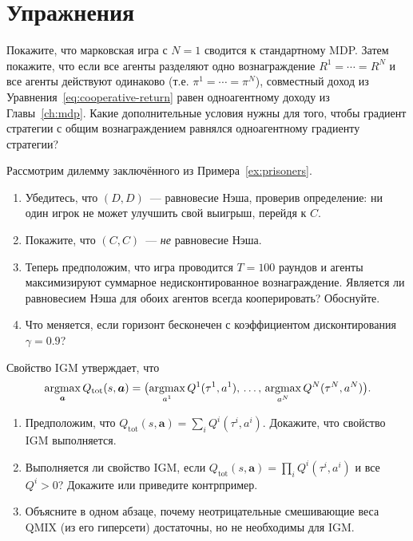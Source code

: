 \section*{Упражнения}

\begin{exercise}
\label{ex:markov-game-reduction}
Покажите, что марковская игра с $N=1$ сводится к стандартному MDP.
Затем покажите, что если все агенты разделяют одно вознаграждение $R^1 = \cdots =
R^N$ и все агенты действуют одинаково (т.е. $\pi^1 = \cdots = \pi^N$),
совместный доход из Уравнения~\eqref{eq:cooperative-return} равен
одноагентному доходу из Главы~\ref{ch:mdp}. Какие дополнительные
условия нужны для того, чтобы градиент стратегии с общим вознаграждением равнялся
одноагентному градиенту стратегии?
\end{exercise}

\begin{exercise}
\label{ex:nash-prisoners}
Рассмотрим дилемму заключённого из Примера~\ref{ex:prisoners}.
\begin{enumerate}[label=(\alph*)]
  \item Убедитесь, что $(D, D)$~--- равновесие Нэша, проверив
    определение: ни один игрок не может улучшить свой выигрыш, перейдя к $C$.
  \item Покажите, что $(C, C)$~--- \emph{не} равновесие Нэша.
  \item Теперь предположим, что игра проводится $T = 100$ раундов и
    агенты максимизируют суммарное недисконтированное вознаграждение. Является ли
    равновесием Нэша для обоих агентов всегда кооперировать? Обоснуйте.
  \item Что меняется, если горизонт бесконечен с коэффициентом дисконтирования
    $\gamma = 0.9$?
\end{enumerate}
\end{exercise}

\begin{exercise}
\label{ex:igm-proof}
Свойство IGM утверждает, что
\[
\operatorname*{argmax}_{\bm{a}} Q_\mathrm{tot}(s, \bm{a}) = \bigl(\operatorname*{argmax}_{a^1}
Q^1(\tau^1, a^1),\, \ldots,\, \operatorname*{argmax}_{a^N} Q^N(\tau^N, a^N)\bigr).
\]
\begin{enumerate}[label=(\alph*)]
  \item Предположим, что $Q_\mathrm{tot}(s, \bm{a}) = \sum_i Q^i(\tau^i,
    a^i)$. Докажите, что свойство IGM выполняется.
  \item Выполняется ли свойство IGM, если
    $Q_\mathrm{tot}(s, \bm{a}) = \prod_i Q^i(\tau^i, a^i)$ и
    все $Q^i > 0$? Докажите или приведите контрпример.
  \item Объясните в одном абзаце, почему неотрицательные смешивающие
    веса QMIX (из его гиперсети) достаточны, но не необходимы
    для IGM.
\end{enumerate}
\end{exercise}

